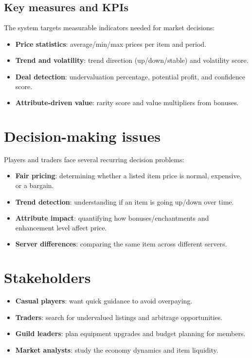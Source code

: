 \subsection{Key measures and KPIs}
The system targets measurable indicators needed for market decisions:
\begin{itemize}
  \item \textbf{Price statistics}: average/min/max prices per item and period.
  \item \textbf{Trend and volatility}: trend direction (up/down/stable) and volatility score.
  \item \textbf{Deal detection}: undervaluation percentage, potential profit, and confidence score.
  \item \textbf{Attribute-driven value}: rarity score and value multipliers from bonuses.
\end{itemize}

\section{Decision-making issues}
Players and traders face several recurring decision problems:
\begin{itemize}
  \item \textbf{Fair pricing}: determining whether a listed item price is normal, expensive, or a bargain.
  \item \textbf{Trend detection}: understanding if an item is going up/down over time.
  \item \textbf{Attribute impact}: quantifying how bonuses/enchantments and enhancement level affect price.
  \item \textbf{Server differences}: comparing the same item across different servers.
\end{itemize}

\section{Stakeholders}
\begin{itemize}
  \item \textbf{Casual players}: want quick guidance to avoid overpaying.
  \item \textbf{Traders}: search for undervalued listings and arbitrage opportunities.
  \item \textbf{Guild leaders}: plan equipment upgrades and budget planning for members.
  \item \textbf{Market analysts}: study the economy dynamics and item liquidity.
\end{itemize}

